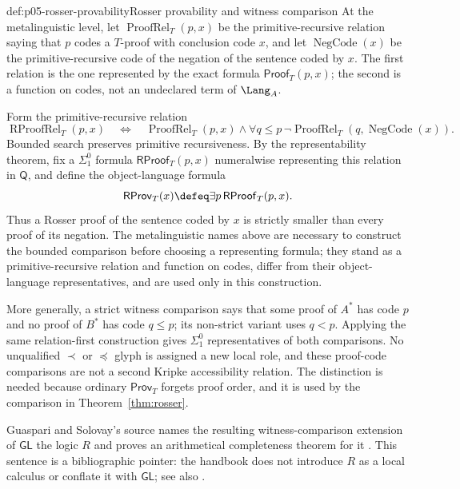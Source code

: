 \begin{hbdefinition}{def:p05-rosser-provability}{Rosser provability and witness comparison}
At the metalinguistic level, let
\(\operatorname{ProofRel}_T(p,x)\) be the primitive-recursive relation saying
that \(p\) codes a \(T\)-proof with conclusion code \(x\), and let
\(\operatorname{NegCode}(x)\) be the primitive-recursive code of the negation
of the sentence coded by \(x\).  The first relation is the one represented by
the exact formula \(\mathsf{Proof}_T(p,x)\); the second is a function on
codes, not an undeclared term of \(\Lang_A\).

Form the primitive-recursive relation
\[
 \operatorname{RProofRel}_T(p,x)
 \quad\Longleftrightarrow\quad
 \operatorname{ProofRel}_T(p,x)\land
 \forall q\leq p\,
   \neg\operatorname{ProofRel}_T
      (q,\operatorname{NegCode}(x)).
\]
Bounded search preserves primitive recursiveness.  By the representability
theorem, fix a \(\Sigma^0_1\) formula
\(\mathsf{RProof}_T(p,x)\) numeralwise representing this relation in
\(\mathsf Q\), and define the object-language formula
\[
 \mathsf{RProv}_T(x)\defeq\exists p\,\mathsf{RProof}_T(p,x).
\]
Thus a Rosser proof of the sentence coded by \(x\) is strictly smaller than
every proof of its negation.  The metalinguistic names above are necessary to
construct the bounded comparison before choosing a representing formula; they
stand as a primitive-recursive relation and function on codes, differ from
their object-language representatives, and are used only in this construction.

More generally, a strict witness comparison says that some proof of \(A^*\)
has code \(p\) and no proof of \(B^*\) has code \(q\leq p\); its non-strict
variant uses \(q<p\).  Applying the same relation-first construction gives
\(\Sigma^0_1\) representatives of both comparisons.  No unqualified
\(\prec\) or \(\preccurlyeq\) glyph is assigned a new local role, and these
proof-code comparisons are not a second Kripke accessibility relation.  The
distinction is needed because ordinary \(\mathsf{Prov}_T\) forgets proof
order, and it is used by the comparison in Theorem~\ref{thm:rosser}.

Guaspari and Solovay's source names the resulting witness-comparison extension
of \(\mathsf{GL}\) the logic \(R\) and proves an arithmetical completeness
theorem for it \cite{GuaspariSolovay1979}.  This sentence is a bibliographic
pointer: the handbook does not introduce \(R\) as a local calculus or conflate
it with \(\mathsf{GL}\); see also \cite{Lindstrom2003}.
\end{hbdefinition}

